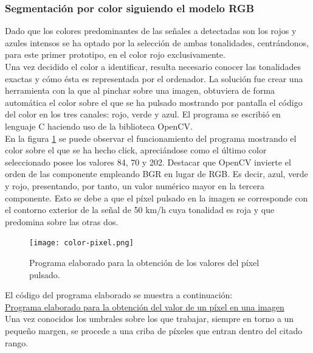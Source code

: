 \subsubsection {Segmentación por color siguiendo el modelo RGB}
\label{sec:seg-color-rgb}

Dado que los colores predominantes de las señales a detectadas son los rojos y azules intensos se ha optado por la selección de ambas tonalidades, centrándonos, para este primer prototipo, en el color rojo exclusivamente.\\

Una vez decidido el color a identificar, resulta necesario conocer las tonalidades exactas y cómo ésta es representada por el ordenador. La solución fue crear una herramienta con la que al pinchar sobre una imagen, obtuviera de forma automática el color sobre el que se ha pulsado mostrando por pantalla el código del color en los tres canales: rojo, verde y azul. El programa se escribió en lenguaje C haciendo uso de la biblioteca OpenCV.\\

 En la figura \ref{fig:color-pixel} se puede observar el funcionamiento del programa mostrando el color sobre el que se ha hecho click, apreciándose como el último color seleccionado posee los valores 84, 70 y 202. Destacar que OpenCV invierte el orden de las componente empleando BGR en lugar de RGB. Es decir, azul, verde y rojo, presentando, por tanto, un valor numérico mayor en la tercera componente. Esto se debe a que el píxel pulsado en la imagen se corresponde con el contorno exterior de la señal de 50 km/h cuya tonalidad es roja y que predomina sobre las otras dos.\\

\begin{figure}[H]
  \begin{center}
    \texttt{[image: color-pixel.png]}
  \end{center}
  \caption{Programa elaborado para la obtención de los valores del píxel pulsado.}
  \label{fig:color-pixel}
\end{figure}

El código del programa elaborado se muestra a continuación:\\

\underline{Programa elaborado para la obtención del valor de un píxel en una imagen}\\


Una vez conocidos los umbrales sobre los que trabajar, siempre en torno a un pequeño margen, se procede a una criba de píxeles que entran dentro del citado rango.\\

